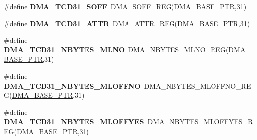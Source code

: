 \begin{DoxyCompactItemize}
\item 
\hypertarget{group___d_m_a___register___accessor___macros_ga15430b53b3e8f42d5401209c534be946}{}\#define {\bfseries D\+M\+A\+\_\+\+T\+C\+D31\+\_\+\+S\+O\+F\+F}~D\+M\+A\+\_\+\+S\+O\+F\+F\+\_\+\+R\+E\+G(\hyperlink{group___d_m_a___peripheral_ga6997fbc1b1973e9f27170217a3bd6f22}{D\+M\+A\+\_\+\+B\+A\+S\+E\+\_\+\+P\+T\+R},31)\label{group___d_m_a___register___accessor___macros_ga15430b53b3e8f42d5401209c534be946}

\item 
\hypertarget{group___d_m_a___register___accessor___macros_ga484be47628158abe8d462c0a458e801d}{}\#define {\bfseries D\+M\+A\+\_\+\+T\+C\+D31\+\_\+\+A\+T\+T\+R}~D\+M\+A\+\_\+\+A\+T\+T\+R\+\_\+\+R\+E\+G(\hyperlink{group___d_m_a___peripheral_ga6997fbc1b1973e9f27170217a3bd6f22}{D\+M\+A\+\_\+\+B\+A\+S\+E\+\_\+\+P\+T\+R},31)\label{group___d_m_a___register___accessor___macros_ga484be47628158abe8d462c0a458e801d}

\item 
\hypertarget{group___d_m_a___register___accessor___macros_ga58d447d417243dce0cc76e21304ec7e3}{}\#define {\bfseries D\+M\+A\+\_\+\+T\+C\+D31\+\_\+\+N\+B\+Y\+T\+E\+S\+\_\+\+M\+L\+N\+O}~D\+M\+A\+\_\+\+N\+B\+Y\+T\+E\+S\+\_\+\+M\+L\+N\+O\+\_\+\+R\+E\+G(\hyperlink{group___d_m_a___peripheral_ga6997fbc1b1973e9f27170217a3bd6f22}{D\+M\+A\+\_\+\+B\+A\+S\+E\+\_\+\+P\+T\+R},31)\label{group___d_m_a___register___accessor___macros_ga58d447d417243dce0cc76e21304ec7e3}

\item 
\hypertarget{group___d_m_a___register___accessor___macros_gae2c84241ae133914ce4ba772db9b6ef1}{}\#define {\bfseries D\+M\+A\+\_\+\+T\+C\+D31\+\_\+\+N\+B\+Y\+T\+E\+S\+\_\+\+M\+L\+O\+F\+F\+N\+O}~D\+M\+A\+\_\+\+N\+B\+Y\+T\+E\+S\+\_\+\+M\+L\+O\+F\+F\+N\+O\+\_\+\+R\+E\+G(\hyperlink{group___d_m_a___peripheral_ga6997fbc1b1973e9f27170217a3bd6f22}{D\+M\+A\+\_\+\+B\+A\+S\+E\+\_\+\+P\+T\+R},31)\label{group___d_m_a___register___accessor___macros_gae2c84241ae133914ce4ba772db9b6ef1}

\item 
\hypertarget{group___d_m_a___register___accessor___macros_ga2706581e4b59e5a777509e9bca97e3f8}{}\#define {\bfseries D\+M\+A\+\_\+\+T\+C\+D31\+\_\+\+N\+B\+Y\+T\+E\+S\+\_\+\+M\+L\+O\+F\+F\+Y\+E\+S}~D\+M\+A\+\_\+\+N\+B\+Y\+T\+E\+S\+\_\+\+M\+L\+O\+F\+F\+Y\+E\+S\+\_\+\+R\+E\+G(\hyperlink{group___d_m_a___peripheral_ga6997fbc1b1973e9f27170217a3bd6f22}{D\+M\+A\+\_\+\+B\+A\+S\+E\+\_\+\+P\+T\+R},31)\label{group___d_m_a___register___accessor___macros_ga2706581e4b59e5a777509e9bca97e3f8}


\end{DoxyCompactItemize}

